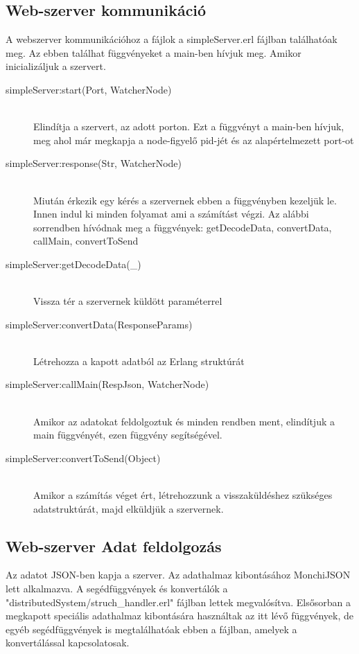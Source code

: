 \subsection{Web-szerver kommunikáció}
	A webszerver kommunikációhoz a fájlok a simpleServer.erl fájlban találhatóak meg. Az ebben találhat függvényeket a main-ben hívjuk meg. Amikor inicializáljuk a szervert.
	\begin{description}
	\item[simpleServer:start(Port, WatcherNode)] 
		\hfill \\
		Elindítja a szervert, az adott porton. \newline
		Ezt a függvényt a main-ben hívjuk, meg ahol már megkapja a node-figyelő pid-jét és az alapértelmezett port-ot 
	\item[simpleServer:response(Str, WatcherNode)] \hfill \\ 
		Miután érkezik egy kérés a szervernek ebben a függvényben kezeljük le. Innen indul ki minden folyamat ami a számítást végzi. \newline 
		Az alábbi sorrendben hívódnak meg a függvények: \newline
		getDecodeData, convertData, callMain, convertToSend
	\item[simpleServer:getDecodeData(\_)] \hfill \\ 
		Vissza tér a szervernek küldött paraméterrel
	\item[simpleServer:convertData(ResponseParams)] \hfill \\ 
		Létrehozza a kapott adatból az Erlang struktúrát
	\item[simpleServer:callMain(RespJson, WatcherNode)] \hfill \\ 
		Amikor az adatokat feldolgoztuk és minden rendben ment, elindítjuk a main függvényét, ezen függvény segítségével.
	\item[simpleServer:convertToSend(Object)] \hfill \\ 
		Amikor a számítás véget ért, létrehozzunk a visszaküldéshez szükséges adatstruktúrát, majd elküldjük a szervernek.
	\end{description}
\subsection{Web-szerver Adat feldolgozás}
	Az adatot JSON-ben kapja a szerver. Az adathalmaz kibontásához MonchiJSON lett alkalmazva. 
	A segédfüggvények és konvertálók a "distributedSystem/struch\_handler.erl" fájlban lettek megvalósítva.\newline
	Elsősorban a megkapott speciális adathalmaz kibontására használtak az itt lévő függvények, de egyéb segédfüggvények is megtalálhatóak ebben a fájlban, amelyek a konvertálással kapcsolatosak.

